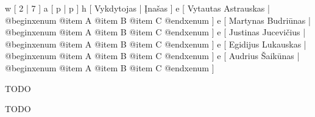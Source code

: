 
\xtable
{
  w [ 2  | 7 ]
  a [ p  | p ]
  h [ Vykdytojas | Įnašas ]
  e [ Vytautas Astrauskas 
  | @begin{xenum} 
      @item A
      @item B
      @item C
    @end{xenum}
  ]
  e [ Martynas Budriūnas
  | @begin{xenum} 
      @item A
      @item B
      @item C
    @end{xenum}
  ]
  e [ Justinas Jucevičius 
  | @begin{xenum} 
      @item A
      @item B
      @item C
    @end{xenum}
  ]
  e [ Egidijus Lukauskas 
  | @begin{xenum} 
      @item A
      @item B
      @item C
    @end{xenum}
  ]
  e [ Audrius Šaikūnas 
  | @begin{xenum} 
      @item A
      @item B
      @item C
    @end{xenum}
  ]
}

TODO

TODO

